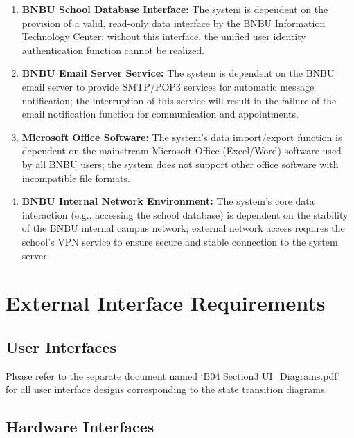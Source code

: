 \documentclass[a4paper,12pt]{article}
\begin{document}
\begin{enumerate}
\item \textbf{BNBU School Database Interface:} The system is dependent on the provision of a valid, read-only data interface by the BNBU Information Technology Center; without this interface, the unified user identity authentication function cannot be realized.
\item \textbf{BNBU Email Server Service:} The system is dependent on the BNBU email server to provide SMTP/POP3 services for automatic message notification; the interruption of this service will result in the failure of the email notification function for communication and appointments.
\item \textbf{Microsoft Office Software:} The system's data import/export function is dependent on the mainstream Microsoft Office (Excel/Word) software used by all BNBU users; the system does not support other office software with incompatible file formats.
\item \textbf{BNBU Internal Network Environment:} The system's core data interaction (e.g., accessing the school database) is dependent on the stability of the BNBU internal campus network; external network access requires the school's VPN service to ensure secure and stable connection to the system server.
\end{enumerate}



\section{External Interface Requirements}

\subsection{User Interfaces}

Please refer to the separate document named `B04 Section3 UI\_Diagrams.pdf' for all user interface designs corresponding to the state transition diagrams.

\subsection{Hardware Interfaces}
\end{document}
